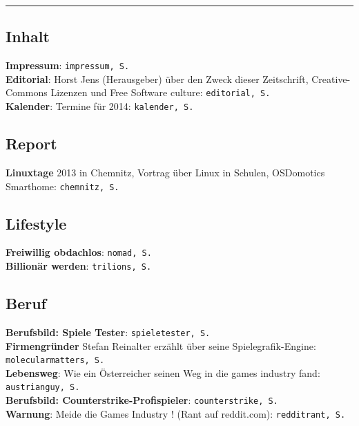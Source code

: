 \documentclass[10pt,a4paper,ngerman,twoside]{article} %
\newcommand{\SepRule}{\noindent	%
\begin{center}
\rule{250pt}{1pt} %
\end{center}
}
\newcommand{\NewsItem}[1]{ %
\usefont{T1}{fvs}{n}{n} %
\vspace{24pt}\large #1\vspace{3pt} %
\par \normalsize \normalfont}
\begin{document}
\SepRule %
\begin{multicols}{3}
\NewsItem{}
\section*{Inhalt} 
\label{inhalt}

\textbf{Impressum}: \texttt{impressum, S. \pageref{impressum}}\\
\textbf{Editorial}: Horst Jens (Herausgeber) über den Zweck dieser Zeitschrift, Creative-Commons Lizenzen und Free Software culture: \texttt{editorial, S. \pageref{editorial}}\\ 
\textbf{Kalender}: Termine für 2014: \texttt{kalender, S. \pageref{kalender}}

\subsection*{Report}

\textbf{Linuxtage} 2013 in Chemnitz, Vortrag über Linux in Schulen, OSDomotics Smarthome: \texttt{chemnitz, S. \pageref{chemnitz}}\\

\subsection*{Lifestyle}

\textbf{Freiwillig obdachlos}: \texttt{nomad, S. \pageref{nomad}}\\
\textbf{Billionär werden}: \texttt{trilions, S. \pageref{trillions}}\\

\subsection*{Beruf}

\textbf{Berufsbild: Spiele Tester}: \texttt{spieletester, S. \pageref{spieletester}}\\
\textbf{Firmengründer} Stefan Reinalter erzählt über seine Spielegrafik-Engine: \texttt{molecularmatters, S. \pageref{molecularmatters}}\\
\textbf{Lebensweg}: Wie ein Österreicher seinen Weg in die games industry fand: \texttt{austrianguy, S. \pageref{austrianguy}}\\
\textbf{Berufsbild: Counterstrike-Profispieler}: \texttt{counterstrike, S. \pageref{counterstrike}}\\
\textbf{Warnung}: Meide die Games Industry ! (Rant auf reddit.com): \texttt{redditrant, S. \pageref{redditrant}}\\


\end{multicols}
\end{document}
